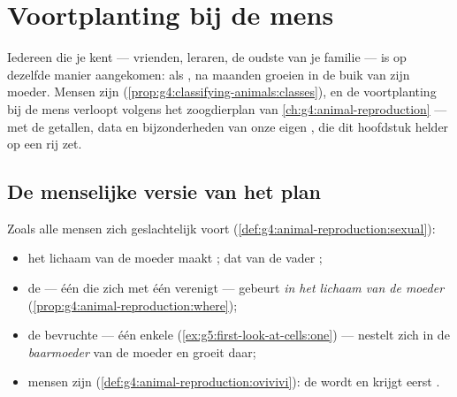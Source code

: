 \chapter{Voortplanting bij de mens}\label{ch:g5:human-reproduction}

Iedereen die je kent --- vrienden, leraren, de oudste van je familie ---
is op dezelfde manier aangekomen: als ,  na maanden groeien
in de buik van zijn moeder. Mensen zijn 
(\cref{prop:g4:classifying-animals:classes}), en de voortplanting bij de
mens verloopt volgens het zoogdierplan van
\cref{ch:g4:animal-reproduction} --- met de getallen, data en
bijzonderheden van onze eigen , die dit hoofdstuk helder op een rij zet.

\section{De menselijke versie van het plan}

\begin{proposition}\label{prop:g5:human-reproduction:plan}
Zoals alle   mensen zich geslachtelijk voort
(\cref{def:g4:animal-reproduction:sexual}):
\begin{itemize}
  \item het lichaam van de moeder maakt \emph{}; dat van de
        vader \emph{};
  \item de  --- één  die zich met één  verenigt
        --- gebeurt \emph{in het lichaam van de moeder}
        (\cref{prop:g4:animal-reproduction:where});
  \item de bevruchte  --- één enkele 
        (\cref{ex:g5:first-look-at-cells:one}) --- nestelt zich in de
        \emph{baarmoeder} van de moeder en groeit daar;
  \item mensen zijn 
        (\cref{def:g4:animal-reproduction:ovivivi}): de  wordt
         en krijgt eerst .
\end{itemize}
\end{proposition}
\admitted

